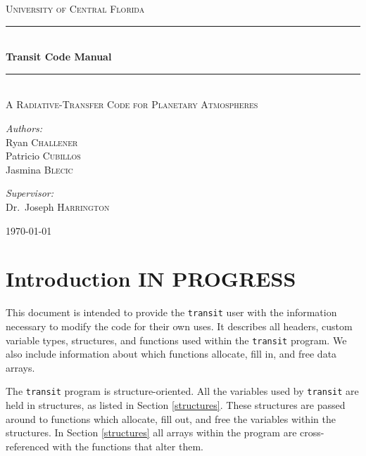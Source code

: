 \documentclass[letterpaper,12pt]{article}
\begin{document}
\begin{titlepage}
\begin{center}

\textsc{\LARGE University of Central Florida}\\[1.5cm]

\rule{\linewidth}{0.5mm} \\[0.4cm]
{ \huge \bfseries Transit Code Manual \\[0.4cm] }
\rule{\linewidth}{0.5mm} \\[1.0cm]

\textsc{\Large A Radiative-Transfer Code for Planetary Atmospheres}\\[1.5cm]

\noindent
\begin{minipage}{0.4\textwidth}
\begin{flushleft} \large
\emph{Authors:}\\
Ryan     \textsc{Challener} \\
Patricio \textsc{Cubillos}\\
Jasmina  \textsc{Blecic}  \\
\end{flushleft}
\end{minipage}%
\begin{minipage}{0.4\textwidth}
\begin{flushright} \large
\emph{Supervisor:} \\
Dr.~Joseph \textsc{Harrington}
\end{flushright}
\end{minipage}

\vfill

{\large \today}

\end{center}
\end{titlepage}


\section{Introduction IN PROGRESS}
\label{sec:intro}
This document is intended to provide the \texttt{transit} user with the information necessary to modify the code for their own uses. It describes all headers, custom variable types, structures, and functions used within the \texttt{transit} program. We also include information about which functions allocate, fill in, and free data arrays. 

The \texttt{transit} program is structure-oriented. All the variables used by \texttt{transit} are held in structures, as listed in Section \ref{structures}. These structures are passed around to functions which allocate, fill out, and free the variables within the structures. In Section \ref{structures} all arrays within the program are cross-referenced with the functions that alter them.
\end{document}
